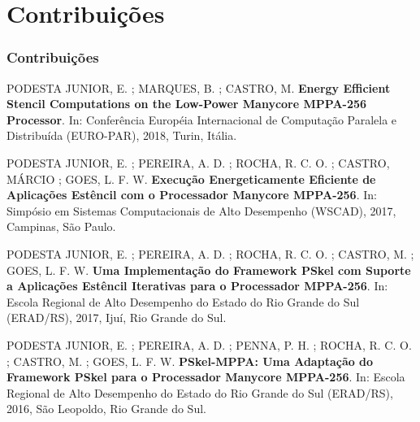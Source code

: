 \documentclass[xcolor={table}]{beamer}
\begin{document}
\section{Contribuições}
\begin{frame}\frametitle{Contribuições}
    \begin{itemize}
    {\tiny
        \item PODESTA JUNIOR, E. ; MARQUES, B. ; CASTRO, M. \textbf{Energy
                Efficient Stencil Computations on the Low-Power Manycore
                MPPA-256 Processor}. In: Conferência Européia Internacional de
            Computação Paralela e Distribuída (EURO-PAR), 2018, Turin, Itália.
        \item PODESTA JUNIOR, E. ; PEREIRA, A. D. ; ROCHA, R. C. O. ; CASTRO,
            MÁRCIO ; GOES, L. F. W. \textbf{Execução Energeticamente Eficiente
                de Aplicações Estêncil com o Processador Manycore MPPA-256}. In:
            Simpósio em Sistemas Computacionais de Alto Desempenho (WSCAD),
            2017, Campinas, São Paulo.

        \item PODESTA JUNIOR, E. ; PEREIRA, A. D. ; ROCHA, R. C. O. ; CASTRO, M.
            ; GOES, L. F. W. \textbf{Uma Implementação do Framework PSkel com
                Suporte a Aplicações Estêncil Iterativas para o Processador
                MPPA-256}. In: Escola Regional de Alto Desempenho do Estado do
            Rio Grande do Sul (ERAD/RS), 2017, Ijuí, Rio Grande do Sul.

        \item PODESTA JUNIOR, E. ; PEREIRA, A. D. ; PENNA, P. H. ; ROCHA, R. C.
            O. ; CASTRO, M. ; GOES, L. F. W. \textbf{PSkel-MPPA: Uma Adaptação
                do Framework PSkel para o Processador Manycore MPPA-256}. In:
            Escola Regional de Alto Desempenho do Estado do Rio Grande do Sul
            (ERAD/RS), 2016, São Leopoldo, Rio Grande do Sul.

    }
    \end{itemize}
\end{frame}
\end{document}
